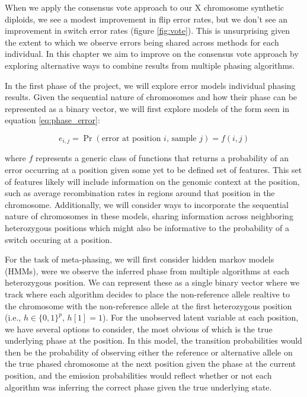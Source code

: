 When we apply the consensus vote approach to our X chromosome synthetic diploids, we see a modest improvement in flip error rates, but we don't see an improvement in switch error rates (figure \ref{fig:vote}). This is unsurprising given the extent to which we observe errors being shared across methods for each individual. In this chapter we aim to improve on the consensus vote approach by exploring alternative ways to combine results from multiple phasing algorithms. 

In the first phase of the project, we will explore error models individual phasing results. Given the sequential nature of chromosomes and how their phase can be represented as a binary vector, we will first explore models of the form seen in equation \ref{eq:phase_error}:

\begin{equation}
\label{eq:phase_error}
    e_{i,j} = \Pr(\textrm{error at position } i \textrm{, sample } j) = f(i, j) 
\end{equation}

where $f$ represents a generic class of functions that returns a probability of an error occurring at a position given some yet to be defined set of features. This set of features likely will include information on the genomic context at the position, such as average recombination rates in regions around that position in the chromosome. Additionally, we will consider ways to incorporate the sequential nature of chromosomes in these models, sharing information across neighboring heterozygous positions which might also be informative to the probability of a switch occuring at a position.

For the task of meta-phasing, we will first consider hidden markov models (HMMs), were we observe the inferred phase from multiple algorithms at each heterozygous position. We can represent these as a single binary vector where we track where each algorithm decides to place the non-reference allele realtive to the chromosome with the non-reference allele at the first heterozygous position 
(i.e., $h \in \{0,1\}^p$, $h[1] = 1$).
For the unobserved latent variable at each position, we have several options to consider, the most obvious of which is the true underlying phase at the position. In this model, the transition probabilities would then be the probability of observing either the reference or alternative allele on the true phased chromosome at the next position given the phase at the current position, and the emission probabilities would reflect whether or not each algorithm was inferring the correct phase given the true underlying state.

